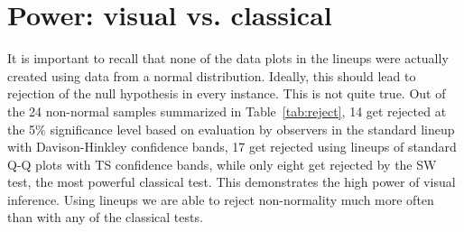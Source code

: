 \documentclass[12pt]{article}\usepackage[]{graphicx}\usepackage[]{color}
\newcommand{\al}[1]{{\color{ForestGreen} #1}}
\begin{document}






\section{Power: visual vs. classical}\label{sec:power2}

It is important to recall that none of the data plots in the lineups were actually created using data from a normal distribution. Ideally, this should lead to rejection of the null hypothesis in every instance.
\al{This is not quite true. Out of the 24 non-normal samples summarized in Table~\ref{tab:reject}, 14 get rejected at the 5\% significance level based on evaluation by observers in the standard lineup with Davison-Hinkley confidence bands, 17 get rejected using lineups of standard Q-Q plots with TS confidence bands, while only eight get rejected by the SW test, the most powerful classical test. This demonstrates the high power  of visual inference.} Using lineups we are able to reject non-normality much more often than with any of the classical tests.
\end{document}
